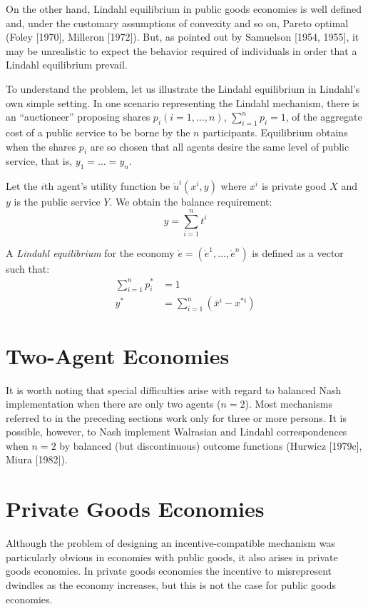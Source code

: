 \documentclass[12pt]{article}
\begin{document}
On the other hand, Lindahl equilibrium in public goods economies is well defined and, under the customary assumptions of convexity and so on, Pareto optimal (Foley [1970], Milleron [1972]). But, as pointed out by Samuelson [1954, 1955], it may be unrealistic to expect the behavior required of individuals in order that a Lindahl equilibrium prevail.

To understand the problem, let us illustrate the Lindahl equilibrium in Lindahl's own simple setting. In one scenario representing the Lindahl mechanism, there is an ``auctioneer'' proposing shares $p_i (i = 1, \dots, n)$, $\sum_{i=1}^n p_i = 1$, of the aggregate cost of a public service to be borne by the $n$ participants. Equilibrium obtains when the shares $p_i$ are so chosen that all agents desire the same level of public service, that is, $y_1 = \dots = y_n$.

Let the $i$th agent's utility function be $\mathring{u}^i(x^i, y)$ where $x^i$ is private good $X$ and $y$ is the public service $Y$. We obtain the balance requirement:
\[
y = \sum_{i=1}^{n} t^i
\]

A \textit{Lindahl equilibrium} for the economy $\mathring{e} = (\mathring{e}^1, \dots, \mathring{e}^n)$ is defined as a vector such that:
\begin{align*}
    \sum_{i=1}^{n} p_i^* &= 1 \\
    y^* &= \sum_{i=1}^{n} (\bar{x}^i - x^{*i})
\end{align*}

\section*{Two-Agent Economies}

It is worth noting that special difficulties arise with regard to balanced Nash implementation when there are only two agents ($n = 2$). Most mechanisms referred to in the preceding sections work only for three or more persons. It is possible, however, to Nash implement Walrasian and Lindahl correspondences when $n = 2$ by balanced (but discontinuous) outcome functions (Hurwicz [1979c], Miura [1982]).

\section*{Private Goods Economies}

Although the problem of designing an incentive-compatible mechanism was particularly obvious in economies with public goods, it also arises in private goods economies. In private goods economies the incentive to misrepresent dwindles as the economy increases, but this is not the case for public goods economies.
\end{document}
